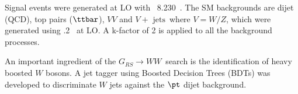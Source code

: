 Signal events were generated at LO with \pythia~8.230~\cite{Sjostrand:2014zea}. The SM backgrounds are dijet (QCD), top pairs ($\ttbar$), $VV$ and $V+\text{ jets}$\ where $V=W/Z$, which were generated using .2~\cite{Alwall:2014hca} at LO. A k-factor of 2 is applied to all the background processes.

\label{sec:mvatagger2}
An important ingredient of the $G_{RS} \rightarrow WW$\ search is the identification of heavy boosted $W$ bosons. A jet tagger using Boosted Decision Trees (BDTs) was developed to discriminate $W$ jets against the $\pt$ dijet background.


